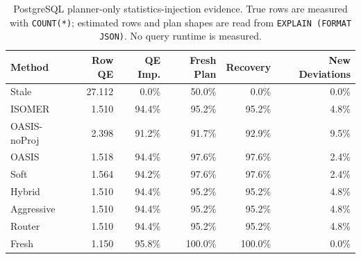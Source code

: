 \begin{table}[t]
  \centering
  \small
  \caption{PostgreSQL planner-only statistics-injection evidence. True rows are measured with \texttt{COUNT(*)}; estimated rows and plan shapes are read from \texttt{EXPLAIN (FORMAT JSON)}. No query runtime is measured.}
  \label{tab:postgres_planner_stats_injection}
  \setlength{\tabcolsep}{4pt}
  \begin{tabular}{lrrrrr}
    \toprule
    Method & Row QE & QE Imp. & Fresh Plan & Recovery & New Deviations \\
    \midrule
    Stale & 27.112 & 0.0\% & 50.0\% & 0.0\% & 0.0\% \\
    ISOMER & 1.510 & 94.4\% & 95.2\% & 95.2\% & 4.8\% \\
    OASIS-noProj & 2.398 & 91.2\% & 91.7\% & 92.9\% & 9.5\% \\
    OASIS & 1.518 & 94.4\% & 97.6\% & 97.6\% & 2.4\% \\
    Soft & 1.564 & 94.2\% & 97.6\% & 97.6\% & 2.4\% \\
    Hybrid & 1.510 & 94.4\% & 95.2\% & 95.2\% & 4.8\% \\
    Aggressive & 1.510 & 94.4\% & 95.2\% & 95.2\% & 4.8\% \\
    Router & 1.510 & 94.4\% & 95.2\% & 95.2\% & 4.8\% \\
    Fresh & 1.150 & 95.8\% & 100.0\% & 100.0\% & 0.0\% \\
    \bottomrule
  \end{tabular}
\end{table}
